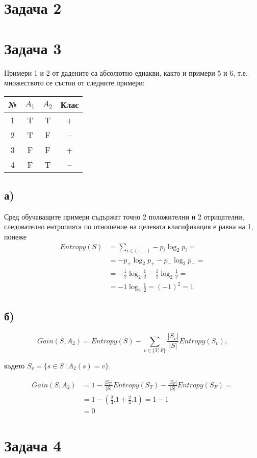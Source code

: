 \documentclass{article}
\begin{document}
\section*{Задача 2}

\section*{Задача 3}

Примери 1 и 2  от дадените са абсолютно еднакви, както и примери 5 и 6, т.е. множеството се състои от следните примери:

\begin{center}
\begin{tabular}{ |c|c|c|c| }
    \hline
    № & \(A_1\) & \(A_2\) & Клас \\
    \hline
    1 & T & T & + \\
    2 & T & F & -- \\
    3 & F & F & + \\
    4 & F & T & -- \\
    \hline
\end{tabular}
\end{center}

\subsection*{а)}

Сред обучаващите примери съдържат точно 2 положителни и 2 отрицателни,
следователно ентропията по отношение на целевата класификация е равна на 1, понеже
\begin{align*}
    Entropy(S) &= \sum_{i \in \{+, -\}} -p_i \log_2 p_i = \\
      &= -p_+ \log_2 p_+ - p_- \log_2 p_- = \\
      &= -\frac{1}{2} \log_2 \frac{1}{2} - \frac{1}{2} \log_2 \frac{1}{2} = \\
      &= -1 \log_2 \frac{1}{2} = (-1)^2 = 1
\end{align*}

\subsection*{б)}

\[
    Gain(S, A_2) = Entropy(S) - \sum_{v \in \{T, F\}} \frac{|S_v|}{|S|} Entropy(S_v),
\]

където \( S_v = \{ s \in S \, | \, A_2(s) = v \} \).

\begin{align*}
    Gain(S, A_2) &= 1 - \frac{|S_T|}{|S|} Entropy(S_T) - \frac{|S_F|}{|S|} Entropy(S_F) = \\
      &= 1 - (\frac{2}{4} . 1 + \frac{2}{4} . 1) = 1 - 1 \\
      &= 0
\end{align*}


\section*{Задача 4}
\end{document}
